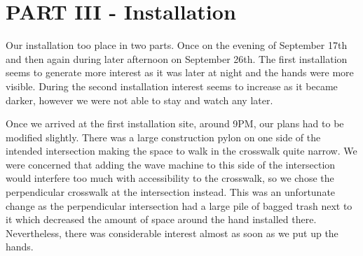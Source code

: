 \documentclass[11pt]{report}
\begin{document}
\clearpage
\section*{PART III - Installation}

Our installation too place in two parts. Once on the evening of September 17th and then again during later afternoon on September 26th. The first installation seems to generate more interest as it was later at night and the hands were more visible. During the second installation interest seems to increase as it became darker, however we were not able to stay and watch any later. 

Once we arrived at the first installation site, around 9PM, our plans had to be modified slightly. There was a large construction pylon on one side of the intended intersection making the space to walk in the crosswalk quite narrow. We were concerned that adding the wave machine to this side of the intersection would interfere too much with accessibility to the crosswalk, so we chose the perpendicular crosswalk at the intersection instead. This was an unfortunate change as the perpendicular intersection had a large pile of bagged trash next to it which decreased the amount of space around the hand installed there. Nevertheless, there was considerable interest almost as soon as we put up the hands.  
\end{document}
